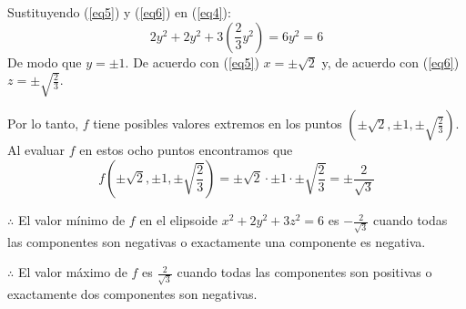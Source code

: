 \documentclass[12pt]{article}
\begin{document}
\begin{itemize}[format=\textbf]
    Sustituyendo (\ref{eq5}) y (\ref{eq6}) en (\ref{eq4}):
    $$
      2y^2 + 2y^2 + 3\left(\frac{2}{3}y^2\right)
      = 6y^2
      = 6
      $$
      De modo que $y=\pm 1$. De acuerdo con (\ref{eq5}) $x=\pm \sqrt{2}$ y, de acuerdo con (\ref{eq6}) $z=\pm \sqrt{\frac{2}{3}}$.

      Por lo tanto, $f$ tiene posibles valores extremos en los puntos
      $\left(\pm \sqrt{2},\pm 1, \pm \sqrt{\frac{2}{3}}\right)$. Al evaluar $f$ en estos ocho puntos encontramos que
      $$
      f\left(\pm \sqrt{2},\pm 1, \pm \sqrt{\frac{2}{3}}\right)
      = \pm \sqrt{2} \cdot \pm 1 \cdot \pm \sqrt{\frac{2}{3}}
      = \pm \frac{2}{\sqrt{3}}
      $$
    
      $\therefore $ El valor mínimo de $f$ en el elipsoide $x^2 + 2y^2 + 3z^2 = 6$ es $-\frac{2}{\sqrt{3}}$
      cuando todas las componentes son negativas o exactamente una componente es negativa.
      
      $\therefore $ El valor máximo de $f$ es $\frac{2}{\sqrt{3}}$
      cuando todas las componentes son positivas o exactamente dos componentes son negativas.
  
\end{itemize}
\end{document}
